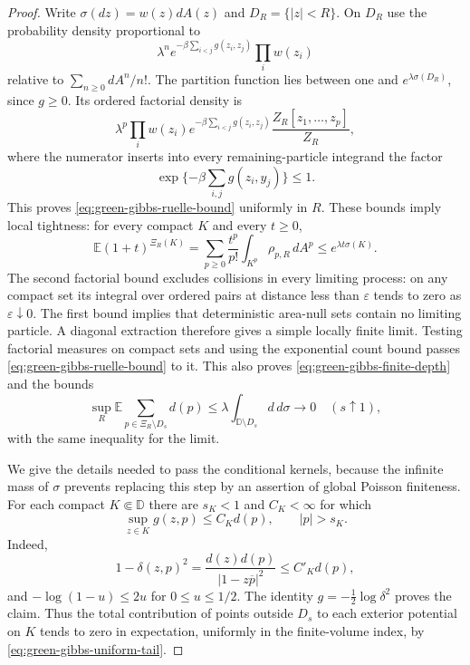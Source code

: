 \documentclass[11pt,a4paper]{article}
\numberwithin{equation}{section}
\theoremstyle{definition}
\theoremstyle{remark}
\newcommand{\D}{\mathbb D}
\begin{document}
\begin{proof}
Write $\sigma(dz)=w(z)dA(z)$ and $D_R=\{|z|<R\}$.  On $D_R$ use the
probability density proportional to
\[
 \lambda^n e^{-\beta\sum_{i<j}g(z_i,z_j)}\prod_iw(z_i)
\]
relative to $\sum_{n\ge0}dA^n/n!$.  The partition function lies between
one and $e^{\lambda\sigma(D_R)}$, since $g\ge0$.  Its ordered factorial
density is
\[
 \lambda^p\prod_iw(z_i)e^{-\beta\sum_{i<j}g(z_i,z_j)}
 \frac{Z_R[z_1,\ldots,z_p]}{Z_R},
\]
where the numerator inserts into every remaining-particle integrand the
factor
\[
 \exp\{-\beta\sum_{i,j}g(z_i,y_j)\}\le1.
\]
This proves
\eqref{eq:green-gibbs-ruelle-bound} uniformly in $R$.  These bounds imply
local tightness: for every compact $K$ and every $t\ge0$,
\[
 \mathbb E(1+t)^{\Xi_R(K)}
 =\sum_{p\ge0}\frac{t^p}{p!}\int_{K^p}\rho_{p,R}\,dA^p
 \le e^{\lambda t\sigma(K)}.
\]
The second factorial bound excludes collisions in every limiting process:
on any compact set its integral over ordered pairs at distance less than
$\varepsilon$ tends to zero as $\varepsilon\downarrow0$.  The first bound implies that deterministic area-null sets contain no
limiting particle.  A diagonal extraction therefore gives a simple locally
finite limit.  Testing factorial measures on compact sets and using the
exponential count bound passes \eqref{eq:green-gibbs-ruelle-bound} to it.
This also proves \eqref{eq:green-gibbs-finite-depth} and the bounds
\begin{equation}\label{eq:green-gibbs-uniform-tail}
 \sup_R\mathbb E\sum_{p\in\Xi_R\setminus D_s}d(p)
 \le\lambda\int_{\D\setminus D_s}d\,d\sigma
       \longrightarrow0\quad(s\uparrow1),
\end{equation}
with the same inequality for the limit.

We give the details needed to pass the conditional kernels, because the
infinite mass of $\sigma$ prevents replacing this step by an assertion of
global Poisson finiteness.  For each compact $K\Subset\D$ there are
$s_K<1$ and $C_K<\infty$ for which
\begin{equation}\label{eq:green-gibbs-green-tail-bound}
 \sup_{z\in K}g(z,p)\le C_Kd(p),\qquad |p|>s_K.
\end{equation}
Indeed,
\[
 1-\delta(z,p)^2
   =\frac{d(z)d(p)}{|1-z\overline p|^2}\le C'_Kd(p),
\]
and $-\log(1-u)\le2u$ for $0\le u\le1/2$.  The identity
$g=-\frac12\log\delta^2$ proves the claim.  Thus the total contribution
of points outside $D_s$ to each exterior potential on $K$ tends to zero
in expectation, uniformly in the finite-volume index, by
\eqref{eq:green-gibbs-uniform-tail}.


\end{proof}
\end{document}
